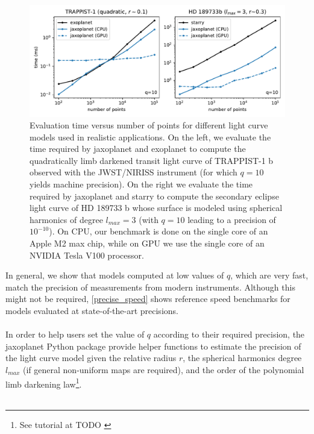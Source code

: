 \documentclass[modern]{aastex631}
\begin{document}
\begin{figure}[H]
    \begin{center}
        \includegraphics[width=\textwidth]{../workflows/speed/figures/speed_vs_N_realistic.pdf}
        \caption{Evaluation time versus number of points for different light curve models used in realistic applications. On the left, we evaluate the time required by \textsf{jaxoplanet} and \textsf{exoplanet} to compute the quadratically limb darkened transit light curve of TRAPPIST-1 b observed with the JWST/NIRISS instrument (for which $q=10$ yields machine precision). On the right we evaluate the time required by \textsf{jaxoplanet} and \textsf{starry} to compute the secondary eclipse light curve of HD 189733 b whose surface is modeled using spherical harmonics of degree $l_{max}=3$ (with $q=10$ leading to a precision of $10^{-10}$). On CPU, our benchmark is done on the single core of an Apple M2 max chip, while on GPU we use the single core of an NVIDIA Tesla V100 processor. }
        \label{fig:real_benchmark}
    \end{center}
\end{figure}

In general, we show that models computed at low values of $q$, which are very fast, match the precision of measurements from modern instruments. Although this might not be required, \autoref{precise_speed} shows reference speed benchmarks for models evaluated at state-of-the-art precisions.\\\\
In order to help users set the value of $q$ according to their required precision, the \textsf{jaxoplanet} Python package provide helper functions to estimate the precision of the light curve model given the relative radius $r$, the spherical harmonics degree $l_{max}$ (if general non-uniform maps are required), and the order of the polynomial limb darkening law\footnote{See tutorial at TODO \href{}{}}.\\\\
\end{document}
